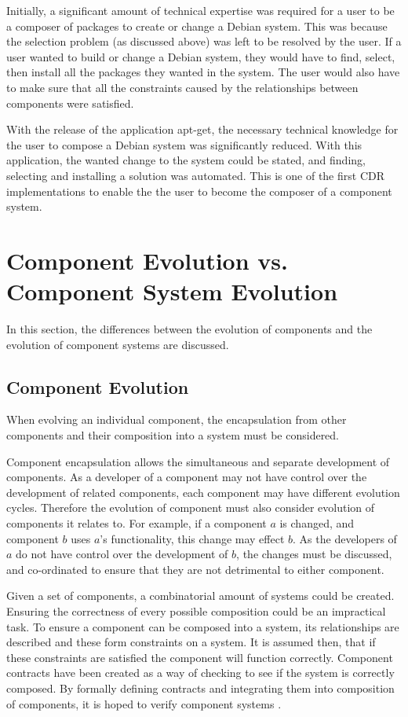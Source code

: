 Initially, a significant amount of technical expertise was required for a user to be a composer of packages to create or change a Debian system.
This was because the selection problem (as discussed above) was left to be resolved by the user.
If a user wanted to build or change a Debian system, they would have to find, select, then install all the packages they wanted in the system.
The user would also have to make sure that all the constraints caused by the relationships between components were satisfied.

With the release of the application apt-get, the necessary technical knowledge for the user to compose a Debian system was significantly reduced.
With this application, the wanted change to the system could be stated, and finding, selecting and installing a solution was automated.
This is one of the first CDR implementations to enable the the user to become the composer of a component system.

\section{Component Evolution vs. Component System Evolution}
\label{background.componentsystemevolution}
In this section, the differences between the evolution of components and the evolution of component systems are discussed.

\subsection{Component Evolution}
When evolving an individual component, the encapsulation from other components and their composition into a system must be considered.

Component encapsulation allows the simultaneous and separate development of components.
As a developer of a component may not have control over the development of related components, each component may have different evolution cycles.
Therefore the evolution of component must also consider evolution of components it relates to.
For example, if a component $a$ is changed, and component $b$ uses $a$'s functionality, this change may effect $b$.
As the developers of $a$ do not have control over the development of $b$, the changes must be discussed, and co-ordinated to ensure that they are not detrimental to either component.

Given a set of components, a combinatorial amount of systems could be created.
Ensuring the correctness of every possible composition could be an impractical task.
To ensure a component can be composed into a system, its relationships are described and these form constraints on a system.
It is assumed then, that if these constraints are satisfied the component will function correctly.
Component contracts \citep{Watkins1999} have been created as a way of checking to see if the system is correctly composed.
By formally defining contracts and integrating them into composition of components, it is hoped to verify component systems \citep{Dietrich2010}.


